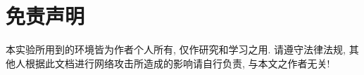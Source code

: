 \documentclass[../main.tex]{subfiles}
\begin{document}
\section{免责声明}
本实验所用到的环境皆为作者个人所有, 仅作研究和学习之用.
请遵守法律法规, 其他人根据此文档进行网络攻击所造成的影响请自行负责,
与本文之作者无关!
\end{document}
